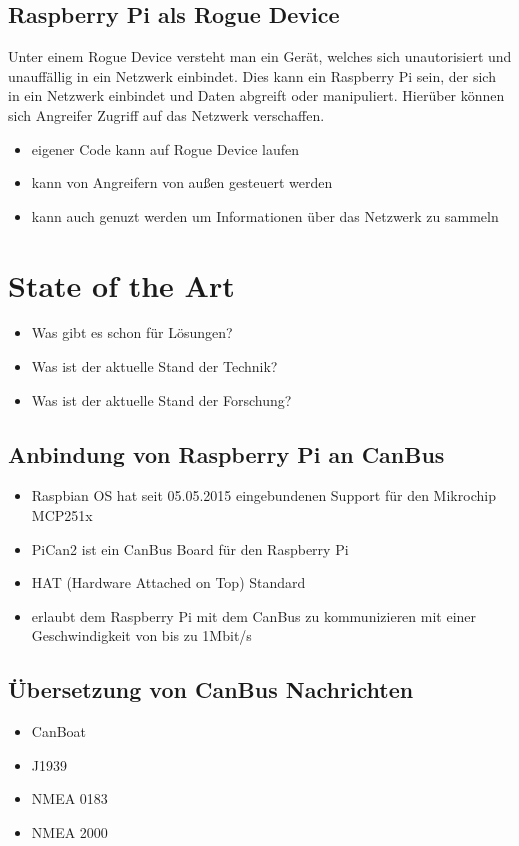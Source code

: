\subsection{Raspberry Pi als Rogue Device}
Unter einem Rogue Device versteht man ein Gerät, welches sich unautorisiert und unauffällig in ein Netzwerk einbindet.
Dies kann ein Raspberry Pi sein, der sich in ein Netzwerk einbindet und Daten abgreift oder manipuliert. Hierüber können 
sich Angreifer Zugriff auf das Netzwerk verschaffen. 
\begin{itemize}
    \item eigener Code kann auf Rogue Device laufen
    \item kann von Angreifern von außen gesteuert werden
    \item kann auch genuzt werden um Informationen über das Netzwerk zu sammeln
\end{itemize}

\section{State of the Art}
\begin{itemize}
    \item Was gibt es schon für Lösungen?
    \item Was ist der aktuelle Stand der Technik?
    \item Was ist der aktuelle Stand der Forschung?
\end{itemize}
\subsection{Anbindung von Raspberry Pi an CanBus}
\begin{itemize}
    \item Raspbian OS hat seit 05.05.2015 eingebundenen Support für den Mikrochip MCP251x
\end{itemize}
\cite{Salunkhe2016}
\begin{itemize}
    \item PiCan2 ist ein CanBus Board für den Raspberry Pi
    \item HAT (Hardware Attached on Top) Standard
    \item erlaubt dem Raspberry Pi mit dem CanBus zu kommunizieren mit einer Geschwindigkeit von bis zu 1Mbit/s
\end{itemize}
\cite{Pant2019}
\subsection{Übersetzung von CanBus Nachrichten}
\begin{itemize}
    \item CanBoat
    \item J1939
    \item NMEA 0183
    \item NMEA 2000
\end{itemize}